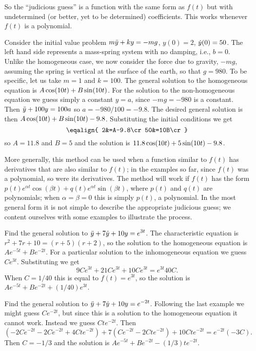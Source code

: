 So the ``judicious guess'' is a function with the same form as $f(t)$
but with undetermined (or better, yet to be determined)
coefficients. This works whenever $f(t)$ is a polynomial.

\example Consider the initial value problem $\displaystyle m\ddot y +ky=-mg$,
$y(0)=2$, $\displaystyle\dot y(0)=50$. The left hand side represents a mass-spring
system with no damping, i.e., $b=0$. Unlike the homogeneous case, we
now consider the force due to gravity, $-mg$, assuming the spring is
vertical at the surface of the earth, so that $g=980$. To be specific,
let us take $m=1$ and $k=100$. The general solution to the homogeneous
equation is $\displaystyle A\cos(10t)+B\sin(10t)$. For the solution to the 
non-homogeneous equation we guess simply a constant $y=a$, since $-mg=-980$
is a constant. Then $\displaystyle \ddot y+100y= 100a$ so $a=-980/100=-9.8$. The
desired general solution is then $\displaystyle A\cos(10t)+B\sin(10t)-9.8$.
Substituting the initial conditions we get
$$\eqalign{
2&=A-9.8\cr
50&=10B\cr}
$$
so $A=11.8$ and $B=5$ and the solution is $\displaystyle 11.8\cos(10t)+5\sin(10t)-9.8$.
\endexample

More generally, this method can be used when a function similar to
$f(t)$ has derivatives that are also similar to $f(t)$; in the
examples so far, since $f(t)$ was a polynomial, so were its derivatives.
The method will work if $f(t)$ has the form $p(t)e^{\alpha t}\cos(\beta t)+
q(t)e^{\alpha t}\sin(\beta t)$, where $p(t)$ and $q(t)$ are
polynomials; when $\alpha=\beta=0$ this is simply $p(t)$, a
polynomial. In the most general form it is not simple to describe the
appropriate judicious guess; we content ourselves with some examples
to illustrate the process.

\example Find the general solution to $\displaystyle\ddot y+7\dot
y+10y=e^{3t}$. The characteristic equation is $r^2+7r+10=(r+5)(r+2)$,
so the solution to the homogeneous equation is
$Ae^{-5t}+Be^{-2t}$. For a particular solution to the inhomogeneous
equation we guess $Ce^{3t}$. Substituting we get
$$
9Ce^{3t}+21Ce^{3t}+10Ce^{3t}=e^{3t}40C.
$$
When $C=1/40$ this is equal to $f(t)=e^{3t}$, so the solution is
$Ae^{-5t}+Be^{-2t}+(1/40)e^{3t}$.
\endexample

\example Find the general solution to $\displaystyle\ddot y+7\dot
y+10y=e^{-2t}$. Following the last example we might guess
$Ce^{-2t}$, but since this is a solution to the homogeneous equation
it cannot work. Instead we guess $Cte^{-2t}$. Then
$$
(-2Ce^{-2t}-2Ce^{-2t}+4Cte^{-2t})+7(Ce^{-2t}-2Cte^{-2t})+10Cte^{-2t}
=e^{-2t}(-3C).
$$
Then $C=-1/3$ and the solution is $Ae^{-5t}+Be^{-2t}-(1/3)te^{-2t}$.
\endexample

